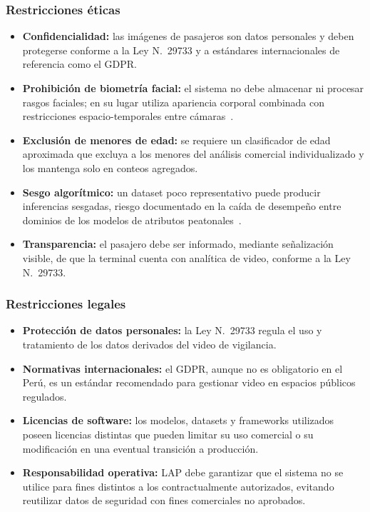 \documentclass[12pt,letterpaper]{article}
\begin{document}
\subsubsection{Restricciones éticas}
\begin{itemize}
    \item \textbf{Confidencialidad:} las imágenes de pasajeros son datos
    personales y deben protegerse conforme a la Ley N.\textdegree~29733 y
    a estándares internacionales de referencia como el GDPR.
    \item \textbf{Prohibición de biometría facial:} el sistema no debe
    almacenar ni procesar rasgos faciales; en su lugar utiliza apariencia
    corporal combinada con restricciones espacio-temporales entre
    cámaras~\cite{mendes2023,ryan2023}.
    \item \textbf{Exclusión de menores de edad:} se requiere un
    clasificador de edad aproximada que excluya a los menores del
    análisis comercial individualizado y los mantenga solo en conteos
    agregados.
    \item \textbf{Sesgo algorítmico:} un dataset poco representativo
    puede producir inferencias sesgadas, riesgo documentado en la caída
    de desempeño entre dominios de los modelos de atributos
    peatonales~\cite{jin2024}.
    \item \textbf{Transparencia:} el pasajero debe ser informado, mediante
    señalización visible, de que la terminal cuenta con analítica de
    video, conforme a la Ley N.\textdegree~29733.
\end{itemize}

\subsubsection{Restricciones legales}
\begin{itemize}
    \item \textbf{Protección de datos personales:} la Ley
    N.\textdegree~29733 regula el uso y tratamiento de los datos
    derivados del video de vigilancia.
    \item \textbf{Normativas internacionales:} el GDPR, aunque no es
    obligatorio en el Perú, es un estándar recomendado para gestionar
    video en espacios públicos regulados.
    \item \textbf{Licencias de software:} los modelos, datasets y
    frameworks utilizados poseen licencias distintas que pueden limitar
    su uso comercial o su modificación en una eventual transición a
    producción.
    \item \textbf{Responsabilidad operativa:} LAP debe garantizar que el
    sistema no se utilice para fines distintos a los contractualmente
    autorizados, evitando reutilizar datos de seguridad con fines
    comerciales no aprobados.
\end{itemize}
\end{document}
